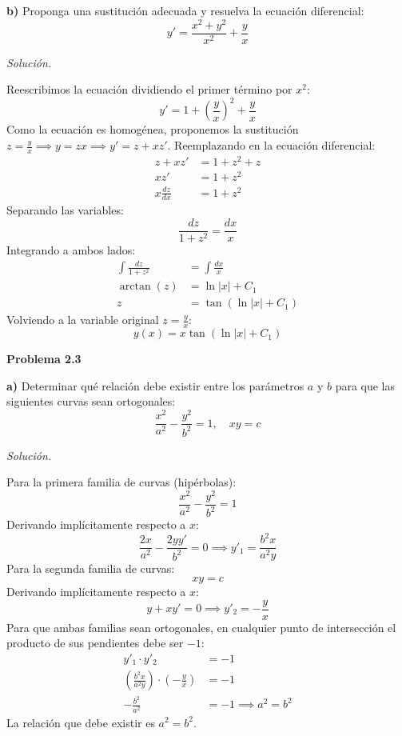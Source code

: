 \documentclass[12pt,letterpaper]{article}
\begin{document}
\medskip
\textbf{b)} Proponga una sustitución adecuada y resuelva la ecuación diferencial:
\[
  y' = \frac{x^2+y^2}{x^2} + \frac{y}{x}
\]

\medskip
\textit{Solución.}

Reescribimos la ecuación dividiendo el primer término por $x^2$:
\[
  y' = 1 + \left(\frac{y}{x}\right)^2 + \frac{y}{x}
\]
Como la ecuación es homogénea, proponemos la sustitución $z = \frac{y}{x} \implies y = zx \implies y' = z + xz'$. Reemplazando en la ecuación diferencial:
\begin{align*}
  z + xz' &= 1 + z^2 + z \\
  xz' &= 1 + z^2 \\
  x \frac{dz}{dx} &= 1 + z^2
\end{align*}
Separando las variables:
\[
  \frac{dz}{1+z^2} = \frac{dx}{x}
\]
Integrando a ambos lados:
\begin{align*}
  \int \frac{dz}{1+z^2} &= \int \frac{dx}{x} \\
  \arctan(z) &= \ln|x| + C_1 \\
  z &= \tan(\ln|x| + C_1)
\end{align*}
Volviendo a la variable original $z = \frac{y}{x}$:
\[
  y(x) = x \tan(\ln|x| + C_1)
\]

\bigskip

\textbf{Problema 2.3}

\medskip
\textbf{a)} Determinar qué relación debe existir entre los parámetros $a$ y $b$ para que las siguientes curvas sean ortogonales:
\[
  \frac{x^2}{a^2} - \frac{y^2}{b^2} = 1, \quad xy = c
\]

\medskip
\textit{Solución.}

Para la primera familia de curvas (hipérbolas):
\[
  \frac{x^2}{a^2} - \frac{y^2}{b^2} = 1
\]
Derivando implícitamente respecto a $x$:
\[
  \frac{2x}{a^2} - \frac{2yy'}{b^2} = 0 \implies y'_1 = \frac{b^2 x}{a^2 y}
\]
Para la segunda familia de curvas:
\[
  xy = c
\]
Derivando implícitamente respecto a $x$:
\[
  y + xy' = 0 \implies y'_2 = -\frac{y}{x}
\]
Para que ambas familias sean ortogonales, en cualquier punto de intersección el producto de sus pendientes debe ser $-1$:
\begin{align*}
  y'_1 \cdot y'_2 &= -1 \\
  \left(\frac{b^2 x}{a^2 y}\right) \cdot \left(-\frac{y}{x}\right) &= -1 \\
  -\frac{b^2}{a^2} &= -1 \implies a^2 = b^2
\end{align*}
La relación que debe existir es $a^2 = b^2$.
\end{document}
